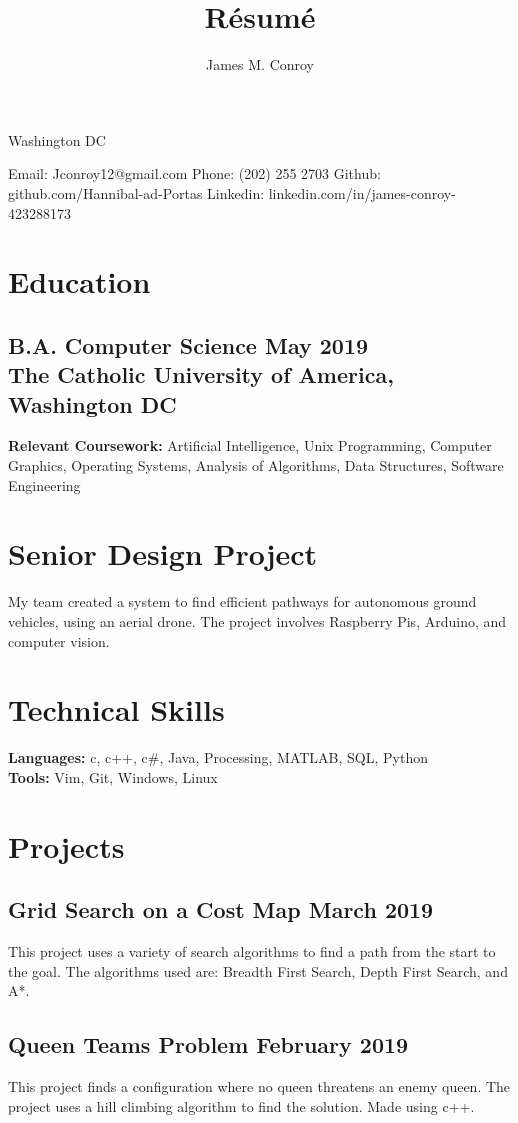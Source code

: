\documentclass{article}
\author{James M. Conroy}
\title{R\'esum\'e}
\makeatletter
\renewcommand{\maketitle} {
	\begin{center}
	{\huge\bfseries
	\theauthor}

	Washington DC
	\end{center}


	Email: Jconroy12@gmail.com
	\hfill Phone: (202) 255 2703
Github: github.com/Hannibal-ad-Portas
	\hfill Linkedin: linkedin.com/in/james-conroy-423288173
}
\makeatother
\begin{document}
\maketitle
\section{Education}
\subsection{B.A. Computer Science \hfill  May 2019 \\
The Catholic University of America, Washington DC}

\textbf {Relevant Coursework:}
Artificial Intelligence,
Unix Programming,
Computer Graphics,
Operating Systems,
Analysis of Algorithms,
Data Structures,
Software Engineering
\section{Senior Design Project}
My team created a system to find efficient pathways for autonomous ground vehicles, using an aerial drone.
The project involves Raspberry Pis, Arduino, and computer vision.
\section{Technical Skills}

\textbf{Languages:}
c,
c++,
c\#,
Java,
Processing,
MATLAB,
SQL,
Python \\
\textbf{Tools:}
Vim,
Git,
Windows,
Linux

\section{Projects}

\subsection{Grid Search on a Cost Map \hfill March 2019}
This project uses a variety of search algorithms to find a path from the start to the goal.
The algorithms used are:
Breadth First Search,
Depth First Search,
and
A*.
\subsection{Queen Teams Problem \hfill February 2019}
This project finds a configuration where no queen threatens an enemy queen.
The project uses a hill climbing algorithm to find the solution.
Made using c++.
\end{document}
